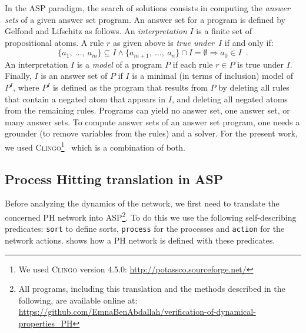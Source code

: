 In the ASP paradigm, the search of solutions consists in computing the \emph{answer sets} of a given answer set program.
An answer set for a program is defined by Gelfond and Lifschitz \cite{DBLP:conf/iclp/GelfondL88} as follows.
An \emph{interpretation} $I$ is a finite set of propositional atoms.
A rule $r$ as given above is \emph{true under~$I$} if and only if:
  \[\{a_1,\ \dots,\ a_{m}\} \subseteq I \wedge \{a_{m+1},\ \ldots,\ a_{n}\} \cap I = \emptyset \Rightarrow a_{0} \in I \enspace.\]
An interpretation $I$ is a \emph{model} of a program $P$ if each rule $r \in P$ is true under $I$.
Finally, $I$ is an answer set of $P$ if $I$ is a minimal (in terms of inclusion) model of $P^{I}$,
where $P^{I}$ is defined as the program that results from $P$ by deleting all rules that contain a negated atom that appears in $I$,
and deleting all negated atoms from the remaining rules.
Programs can yield no answer set, one answer set, or many answer sets.
To compute answer sets of an answer set program, one needs a grounder (to remove variables from the rules) and a solver.
For the present work, we used \textsc{Clingo}\footnote{We used \textsc{Clingo} version 4.5.0: \url{http://potassco.sourceforge.net/}}~\cite{gebser2008user, gebser2010incremental} which is a combination of both.

\subsection{Process Hitting translation in ASP}
Before analyzing the dynamics of the network,
we first need to translate the concerned PH network into ASP\footnote{All programs, including this translation and the methods described in the following, are available online at: \url{https://github.com/EmnaBenAbdallah/verification-of-dynamical-properties_PH}}.
To do this we use the following self-describing predicates:
\texttt{sort} to define sorts, \texttt{process} for the processes and \texttt{action} for the network actions.
 shows how a PH network is defined with these predicates.

